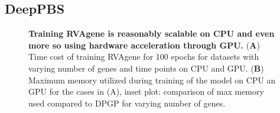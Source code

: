 \subsection{DeepPBS}
\begin{center}
    \begin{figure}
        \caption[Computational cost of training RVAgene]{\textbf{Training RVAgene is reasonably scalable on CPU and even more so using hardware acceleration through GPU.} ({\bf A}) Time cost of training RVAgene for 100 epochs for datasets with varying number of genes and time points on CPU and GPU. ({\bf B}) Maximum memory utilized during training of the model on CPU an GPU for the cases in (A), inset plot: comparison of max memory used compared to DPGP for varying number of genes.}
  \label{fig:pdna2}
\end{figure}
\end{center}

